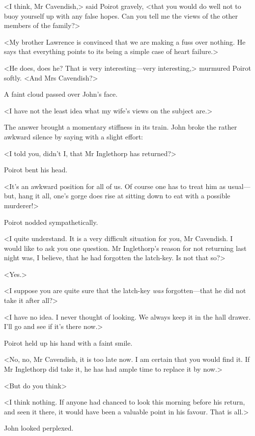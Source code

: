  <I think, Mr Cavendish,> said Poirot gravely, <that you would do well not to buoy yourself up with any false hopes. Can you tell me the views of the other members of the family?> 

 <My brother Lawrence is convinced that we are making a fuss over nothing. He says that everything points to its being a simple case of heart failure.> 

 <He does, does he? That is very interesting—very interesting,> murmured Poirot softly. <And Mrs Cavendish?> 

 A faint cloud passed over John's face. 

 <I have not the least idea what my wife's views on the subject are.> 

 The answer brought a momentary stiffness in its train. John broke the rather awkward silence by saying with a slight effort: 

 <I told you, didn't I, that Mr Inglethorp has returned?> 

 Poirot bent his head. 

 <It's an awkward position for all of us. Of course one has to treat him as usual—but, hang it all, one's gorge does rise at sitting down to eat with a possible murderer!> 

 Poirot nodded sympathetically. 

 <I quite understand. It is a very difficult situation for you, Mr Cavendish. I would like to ask you one question. Mr Inglethorp's reason for not returning last night was, I believe, that he had forgotten the latch-key. Is not that so?> 

 <Yes.> 

 <I suppose you are quite sure that the latch-key \emph{was} forgotten—that he did not take it after all?> 

 <I have no idea. I never thought of looking. We always keep it in the hall drawer. I'll go and see if it's there now.> 

 Poirot held up his hand with a faint smile. 

 <No, no, Mr Cavendish, it is too late now. I am certain that you would find it. If Mr Inglethorp did take it, he has had ample time to replace it by now.> 

 <But do you think\longdash> 

 <I think nothing. If anyone had chanced to look this morning before his return, and seen it there, it would have been a valuable point in his favour. That is all.> 

 John looked perplexed. 

